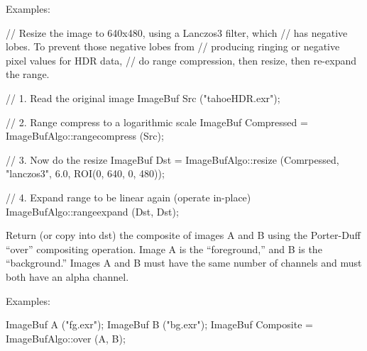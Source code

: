 \smallskip
\noindent Examples:
\begin{code}
    // Resize the image to 640x480, using a Lanczos3 filter, which
    // has negative lobes. To prevent those negative lobes from
    // producing ringing or negative pixel values for HDR data,
    // do range compression, then resize, then re-expand the range.

    // 1. Read the original image
    ImageBuf Src ("tahoeHDR.exr");

    // 2. Range compress to a logarithmic scale
    ImageBuf Compressed = ImageBufAlgo::rangecompress (Src);

    // 3. Now do the resize
    ImageBuf Dst = ImageBufAlgo::resize (Comrpessed, "lanczos3", 6.0,
                                         ROI(0, 640, 0, 480));

    // 4. Expand range to be linear again (operate in-place)
    ImageBufAlgo::rangeexpand (Dst, Dst);
\end{code}
\apiend


 

Return (or copy into {\cf dst}) the composite of 
images {\cf A} and {\cf B} using the Porter-Duff ``over'' compositing
operation.  Image {\cf A} is the
``foreground,'' and {\cf B} is the ``background.''  Images {\cf A} and
{\cf B} must have the same number of channels and must both have an
alpha channel.

\smallskip
\noindent Examples:
\begin{code}
    ImageBuf A ("fg.exr");
    ImageBuf B ("bg.exr");
    ImageBuf Composite = ImageBufAlgo::over (A, B);
\end{code}
\apiend


 


